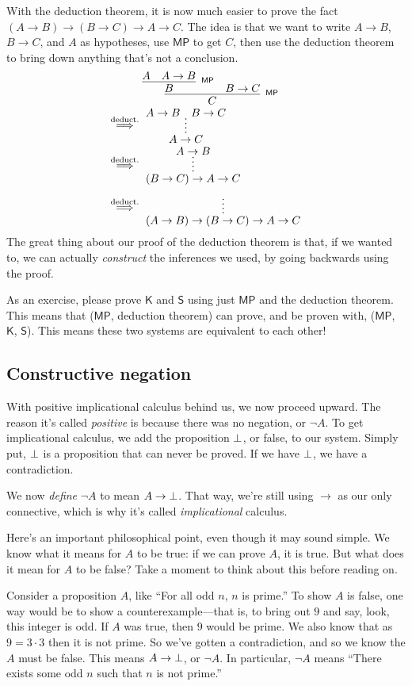 \documentclass[11pt,paper=letter]{scrartcl}
\renewcommand{\sf}{\mathsf}
\renewcommand{\lnot}{\neg}
\newcommand{\vc}[1]{\vcenter{\hbox{#1}}}
\begin{document}
With the deduction theorem, it is now much easier to prove the fact $(A \to B) \to (B \to C) \to A \to C$. The idea is that we want to write $A \to B$, $B \to C$, and $A$ as hypotheses, use $\sf{MP}$ to get $C$, then use the deduction theorem to bring down anything that's not a conclusion.
\begin{align*}
&\vc{\infer[^\sf{MP}]
{C}
{
\infer[^\sf{MP}]{B}{A & A \to B}
& B \to C
}}\\
\;\overset{\text{deduct.}}{\implies}\;&
\vc{
\infer*
{A \to C}
{A \to B & B \to C}
}\\
\;\overset{\text{deduct.}}{\implies}\;&
\vc{
\infer*
{(B \to C) \to A \to C}
{A \to B}
}\\
\;\overset{\text{deduct.}}{\implies}\;&
\vc{
\infer*
{(A \to B) \to (B \to C) \to A \to C}
{\phantom{A}}
}
\end{align*}
The great thing about our proof of the deduction theorem is that, if we wanted to, we can actually \emph{construct} the inferences we used, by going backwards using the proof.

As an exercise, please prove $\sf{K}$ and $\sf{S}$ using just $\sf{MP}$ and the deduction theorem. This means that ($\sf{MP}$, deduction theorem) can prove, and be proven with, ($\sf{MP}$, $\sf{K}$, $\sf{S}$). This means these two systems are equivalent to each other!

\subsection{Constructive negation}

With positive implicational calculus behind us, we now proceed upward. The reason it's called \emph{positive} is because there was no negation, or $\lnot A$. To get implicational calculus, we add the proposition $\bot$, or false, to our system. Simply put, $\bot$ is a proposition that can never be proved. If we have $\bot$, we have a contradiction.

We now \emph{define} $\lnot A$ to mean $A \to \bot$. That way, we're still using $\to$ as our only connective, which is why it's called \emph{implicational} calculus.

Here's an important philosophical point, even though it may sound simple. We know what it means for $A$ to be true: if we can prove $A$, it is true. But what does it mean for $A$ to be false? Take a moment to think about this before reading on.

Consider a proposition $A$, like ``For all odd $n$, $n$ is prime.'' To show $A$ is false, one way would be to show a counterexample---that is, to bring out $9$ and say, look, this integer is odd. If $A$ was true, then $9$ would be prime. We also know that as $9 = 3 \cdot 3$ then it is not prime. So we've gotten a contradiction, and so we know the $A$ must be false. This means $A \to \bot$, or $\lnot A$. In particular, $\lnot A$ means ``There exists some odd $n$ such that $n$ is not prime.''
\end{document}
